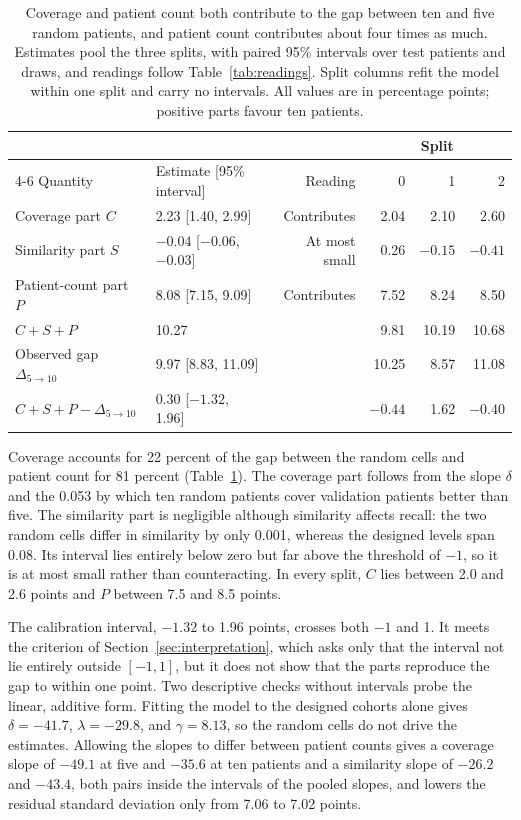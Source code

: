 \begin{table}[htbp]
\centering
\small
\renewcommand{\arraystretch}{1.15}
\begin{tabular}{@{}llrrrr@{}}
\toprule
 & & & \multicolumn{3}{c}{Split} \\
\cmidrule(l){4-6}
Quantity & Estimate [95\% interval] & Reading & 0 & 1 & 2 \\
\midrule
Coverage part $C$ & 2.23 [1.40, 2.99] & Contributes & 2.04 & 2.10 & 2.60 \\
Similarity part $S$ & $-0.04$ [$-0.06$, $-0.03$] & At most small & 0.26 & $-0.15$ & $-0.41$ \\
Patient-count part $P$ & 8.08 [7.15, 9.09] & Contributes & 7.52 & 8.24 & 8.50 \\
\addlinespace
$C+S+P$ & 10.27 & & 9.81 & 10.19 & 10.68 \\
Observed gap $\Delta_{5\to10}$ & 9.97 [8.83, 11.09] & & 10.25 & 8.57 & 11.08 \\
$C+S+P-\Delta_{5\to10}$ & 0.30 [$-1.32$, 1.96] & & $-0.44$ & 1.62 & $-0.40$ \\
\bottomrule
\end{tabular}
\caption{Coverage and patient count both contribute to the gap between ten and five random patients, and patient count contributes about four times as much. Estimates pool the three splits, with paired 95\% intervals over test patients and draws, and readings follow Table~\ref{tab:readings}. Split columns refit the model within one split and carry no intervals. All values are in percentage points; positive parts favour ten patients.}
\label{tab:parts}
\end{table}

\noindent Coverage accounts for 22 percent of the gap between the random cells and patient count for 81 percent (Table~\ref{tab:parts}). The coverage part follows from the slope $\delta$ and the 0.053 by which ten random patients cover validation patients better than five. The similarity part is negligible although similarity affects recall: the two random cells differ in similarity by only 0.001, whereas the designed levels span 0.08. Its interval lies entirely below zero but far above the threshold of $-1$, so it is at most small rather than counteracting. In every split, $C$ lies between 2.0 and 2.6 points and $P$ between 7.5 and 8.5 points.

The calibration interval, $-1.32$ to 1.96 points, crosses both $-1$ and 1. It meets the criterion of Section~\ref{sec:interpretation}, which asks only that the interval not lie entirely outside $[-1,1]$, but it does not show that the parts reproduce the gap to within one point. Two descriptive checks without intervals probe the linear, additive form. Fitting the model to the designed cohorts alone gives $\delta=-41.7$, $\lambda=-29.8$, and $\gamma=8.13$, so the random cells do not drive the estimates. Allowing the slopes to differ between patient counts gives a coverage slope of $-49.1$ at five and $-35.6$ at ten patients and a similarity slope of $-26.2$ and $-43.4$, both pairs inside the intervals of the pooled slopes, and lowers the residual standard deviation only from 7.06 to 7.02 points.

